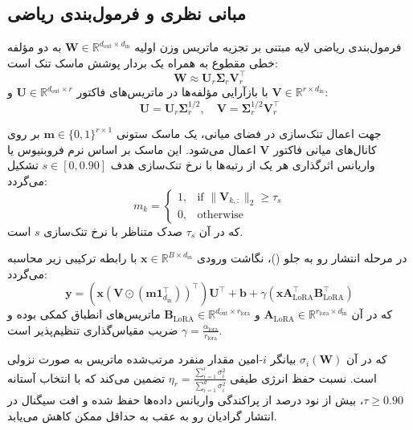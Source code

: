 \subsection{مبانی نظری و فرمول‌بندی ریاضی}
فرمول‌بندی ریاضی لایه  مبتنی بر تجزیه ماتریس وزن اولیه $\mathbf{W} \in \mathbb{R}^{d_{\text{out}} \times d_{\text{in}}}$ به دو مؤلفه خطی مقطوع به همراه یک بردار پوشش ماسک تنک است:
\begin{equation}
\mathbf{W} \approx \mathbf{U}_r \mathbf{\Sigma}_r \mathbf{V}_r^\top
\end{equation}
با بازآرایی مؤلفه‌ها در ماتریس‌های فاکتور $\mathbf{U} \in \mathbb{R}^{d_{\text{out}} \times r}$ و $\mathbf{V} \in \mathbb{R}^{r \times d_{\text{in}}}$:
\begin{equation}
\mathbf{U} = \mathbf{U}_r \mathbf{\Sigma}_r^{1/2}, \quad \mathbf{V} = \mathbf{\Sigma}_r^{1/2} \mathbf{V}_r^\top
\end{equation}

جهت اعمال تنک‌سازی در فضای میانی، یک ماسک ستونی $\mathbf{m} \in \{0, 1\}^{r \times 1}$ بر روی کانال‌های میانی فاکتور $\mathbf{V}$ اعمال می‌شود. این ماسک بر اساس نرم فروبنیوس یا واریانس اثرگذاری هر یک از رتبه‌ها با نرخ تنک‌سازی هدف $s \in [0, 0.90]$ تشکیل می‌گردد:
\begin{equation}
m_k = \begin{cases}
1, & \text{if } \|\mathbf{V}_{k, :}\|_2 \ge \tau_s \\
0, & \text{otherwise}
\end{cases}
\end{equation}
که در آن $\tau_s$ صدک متناظر با نرخ تنک‌سازی $s$ است.

در مرحله انتشار رو به جلو ()، نگاشت ورودی $\mathbf{x} \in \mathbb{R}^{B \times d_{\text{in}}}$ با رابطه ترکیبی زیر محاسبه می‌گردد:
\begin{equation}
\mathbf{y} = \left(\mathbf{x} (\mathbf{V} \odot (\mathbf{m} \mathbf{1}_{d_{\text{in}}}^\top))^\top \right) \mathbf{U}^\top + \mathbf{b} + \gamma \left( \mathbf{x} \mathbf{A}_{\text{LoRA}}^\top \mathbf{B}_{\text{LoRA}}^\top \right)
\end{equation}
که در آن $\mathbf{A}_{\text{LoRA}} \in \mathbb{R}^{r_{\text{lora}} \times d_{\text{in}}}$ و $\mathbf{B}_{\text{LoRA}} \in \mathbb{R}^{d_{\text{out}} \times r_{\text{lora}}}$ ماتریس‌های انطباق کمکی بوده و $\gamma = \frac{\alpha_{\text{lora}}}{r_{\text{lora}}}$ ضریب مقیاس‌گذاری تنظیم‌پذیر است.

که در آن $\sigma_i(\mathbf{W})$ بیانگر $i$-امین مقدار منفرد مرتب‌شده ماتریس به صورت نزولی است. نسبت حفظ انرژی طیفی $\eta_r = \frac{\sum_{i=1}^r \sigma_i^2}{\sum_{i=1}^{d} \sigma_i^2}$ تضمین می‌کند که با انتخاب آستانه $\tau \ge 0.90$، بیش از نود درصد از پراکندگی واریانس داده‌ها حفظ شده و افت سیگنال در انتشار گرادیان رو به عقب به حداقل ممکن کاهش می‌یابد.

